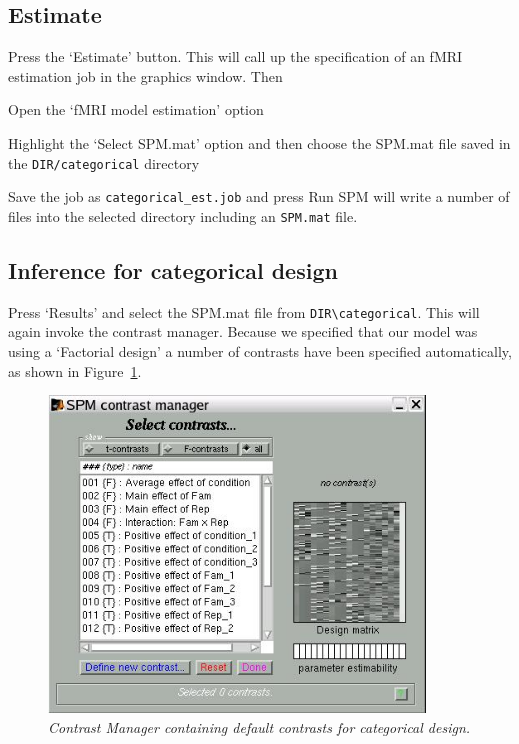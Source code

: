 \subsection{Estimate}

Press the `Estimate' button. This will call up the specification of an fMRI estimation job in the graphics window. Then
\bi
\item{Open the `fMRI model estimation' option}
\item{Highlight the `Select SPM.mat' option and then choose the SPM.mat
file saved in the \verb!DIR/categorical! directory}
\item{Save the job as \verb!categorical_est.job! and press Run}
\ei
SPM will write a number of files into the selected directory including 
an \verb!SPM.mat! file.

\subsection{Inference for categorical design}

Press `Results' and select the SPM.mat file from 
\verb!DIR\categorical!. This will again invoke the contrast manager. Because we specified that 
our model was using a `Factorial design' a number of 
contrasts have been specified automatically, as shown 
in Figure~\ref{cat_contrasts}.
\begin{figure}
\begin{center}
\includegraphics[width=100mm]{faces/cat_contrasts}
\caption{\em Contrast Manager containing default contrasts for categorical design. \label{cat_contrasts}}
\end{center}
\end{figure}


